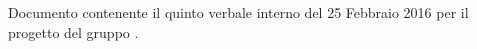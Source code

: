 Documento contenente il quinto verbale interno del 25 Febbraio 2016 per il progetto \progetto{} del gruppo \gruppo{}.
